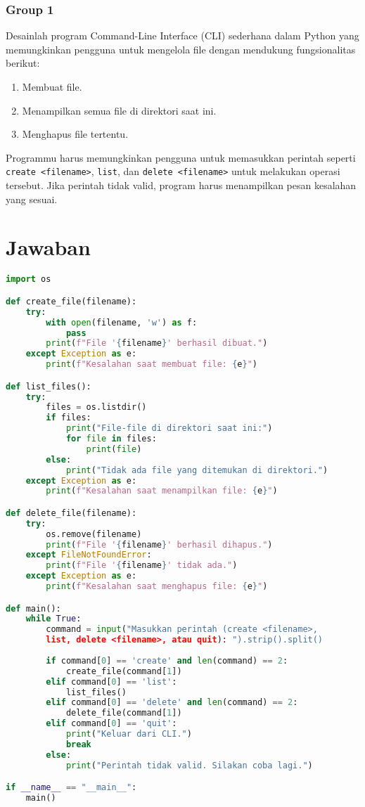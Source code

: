 \documentclass[12pt]{article}
\begin{document}
\subsubsection{Group 1}
Desainlah program Command-Line Interface (CLI) sederhana dalam Python yang memungkinkan pengguna untuk mengelola file dengan mendukung fungsionalitas berikut:
\begin{enumerate}
    \item Membuat file.
    \item Menampilkan semua file di direktori saat ini.
    \item Menghapus file tertentu.
\end{enumerate}

Programmu harus memungkinkan pengguna untuk memasukkan perintah seperti \texttt{create <filename>}, \texttt{list}, dan \texttt{delete <filename>} untuk melakukan operasi tersebut. Jika perintah tidak valid, program harus menampilkan pesan kesalahan yang sesuai.

\newpage
\section*{Jawaban}

\begin{lstlisting}[language=Python, caption=Kode Python untuk manajemen file CLI] 
import os

def create_file(filename):
    try:
        with open(filename, 'w') as f:
            pass
        print(f"File '{filename}' berhasil dibuat.")
    except Exception as e:
        print(f"Kesalahan saat membuat file: {e}")

def list_files():
    try:
        files = os.listdir()
        if files:
            print("File-file di direktori saat ini:")
            for file in files:
                print(file)
        else:
            print("Tidak ada file yang ditemukan di direktori.")
    except Exception as e:
        print(f"Kesalahan saat menampilkan file: {e}")

def delete_file(filename):
    try:
        os.remove(filename)
        print(f"File '{filename}' berhasil dihapus.")
    except FileNotFoundError:
        print(f"File '{filename}' tidak ada.")
    except Exception as e:
        print(f"Kesalahan saat menghapus file: {e}")

def main():
    while True:
        command = input("Masukkan perintah (create <filename>, 
        list, delete <filename>, atau quit): ").strip().split()
        
        if command[0] == 'create' and len(command) == 2:
            create_file(command[1])
        elif command[0] == 'list':
            list_files()
        elif command[0] == 'delete' and len(command) == 2:
            delete_file(command[1])
        elif command[0] == 'quit':
            print("Keluar dari CLI.")
            break
        else:
            print("Perintah tidak valid. Silakan coba lagi.")

if __name__ == "__main__":
    main()
\end{lstlisting}
\end{document}
